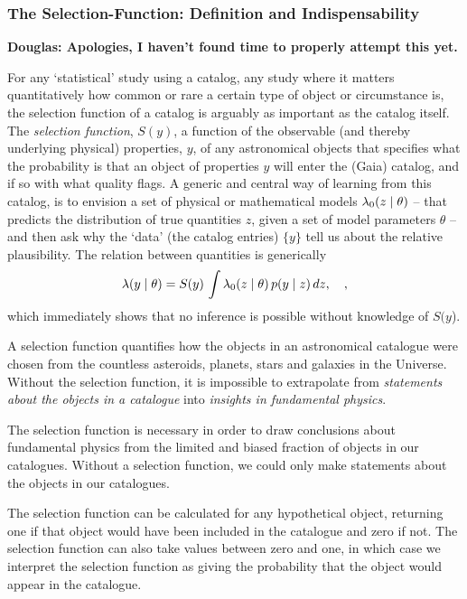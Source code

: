\subsubsection{The Selection-Function: Definition and Indispensability}

\textbf{Douglas: Apologies, I haven't found time to properly attempt this yet.}


For any `statistical' study using a catalog, any study where it matters quantitatively how common or rare a certain type of object or circumstance is, the selection function of a catalog is arguably as important as the catalog itself. The \textit{selection function}, $S(y)$, a function of the observable (and thereby underlying physical) properties, $y$, of any astronomical objects that specifies what the probability is that an object of properties $y$ will enter the (Gaia) catalog, and if so with what quality flags. A generic and central way of learning from this catalog, is to envision a set of physical or mathematical models $\lambda_0(z\mid\theta)$ -- that predicts the
distribution of true quantities $z$, given a set of model parameters $\theta$ -- and then ask
why the `data' (the catalog entries) $\{y\}$ tell us about the relative plausibility. The relation between quantities is generically
\begin{equation}
\lambda(y\mid\theta) = S(y)\,\int\lambda_0(z\mid\theta)\,p(y\mid z)\,dz,
\quad,
\end{equation}
which immediately shows that no inference is possible without knowledge of $S(y$). 


A selection function quantifies how the objects in an astronomical catalogue were chosen from the countless asteroids, planets, stars and galaxies in the Universe. Without the selection function,
it is impossible to extrapolate from \textit{statements about the objects in a catalogue} into \textit{insights in fundamental physics}. 

The selection function is necessary in order to draw conclusions about fundamental physics from the limited and biased fraction of objects in our catalogues. Without a selection function, we could only make statements about the objects in our catalogues.

The selection function can be calculated for any hypothetical object, returning one if that object would have been included in the catalogue and zero if not. The selection function can also take values between zero and one, in which case we interpret the selection function as giving the probability that the object would appear in the catalogue.

